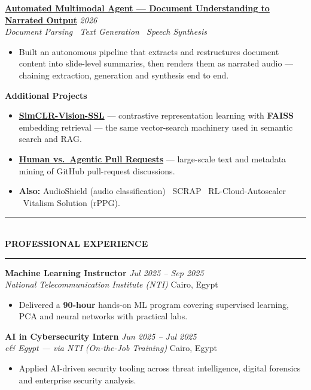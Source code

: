 \documentclass[10pt, a4paper]{article}
\newcommand{\cvsection}[1]{%
  \vspace{3pt}%
  {\color{navy}\rule{\linewidth}{1.1pt}}\\[0.5pt]%
  {\color{navy}\bfseries\fontsize{9.5}{11}\selectfont\uppercase{#1}}\\[-4pt]%
  {\color{teal}\rule{\linewidth}{0.6pt}}%
  \vspace{2pt}%
}
\newcommand{\cventry}[4]{%
  \vspace{2.5pt}%
  \textbf{\color{darkgray}#1} \hfill {\color{midgray}\textit{#3}}\\[-1.5pt]%
  {\color{teal}\textit{#2}} \hfill {\color{midgray}#4}%
}
\newcommand{\cvproject}[3]{%
  \vspace{2.5pt}%
  {\bfseries\color{navy}#1} \hfill {\color{midgray}\textit{#3}}\\[-1.5pt]%
  {\color{teal}\textit{#2}}%
}
\newcommand{\cvmini}[2]{\item {\bfseries\color{navy}#1} --- #2}
\newenvironment{cvitems}{%
  \begin{itemize}[leftmargin=11pt, itemsep=0.5pt, parsep=0pt, topsep=1pt,
                  label={\textcolor{teal}{$\bullet$}}]
}{%
  \end{itemize}%
}
\begin{document}
\cvproject{\href{https://github.com/MahmoudAlyosify/Automated-Multimodal-Agent-PDF-to-Narrated-PowerPoint}{Automated Multimodal Agent --- Document Understanding to Narrated Output}}
          {Document Parsing \textperiodcentered\ Text Generation \textperiodcentered\ Speech Synthesis}
          {2026}
\begin{cvitems}
  \item Built an autonomous pipeline that extracts and restructures document content into slide-level summaries, then renders them as narrated audio --- chaining extraction, generation and synthesis end to end.
\end{cvitems}

\vspace{3pt}
{\bfseries\color{navy}Additional Projects}
\begin{cvitems}
  \cvmini{\href{https://github.com/MahmoudAlyosify/SimCLR-Vision-SSL}{SimCLR-Vision-SSL}}{contrastive representation learning with \textbf{FAISS} embedding retrieval --- the same vector-search machinery used in semantic search and RAG.}
  \cvmini{\href{https://github.com/MahmoudAlyosify/Analyzing-Review-Effort-in-Human-vs.-Agentic-Pull-Requests}{Human vs.\ Agentic Pull Requests}}{large-scale text and metadata mining of GitHub pull-request discussions.}
  \item \textbf{Also:} AudioShield (audio classification) \textperiodcentered\ SCRAP \textperiodcentered\ RL-Cloud-Autoscaler \textperiodcentered\ Vitalism Solution (rPPG).
\end{cvitems}

\cvsection{Professional Experience}

\cventry{Machine Learning Instructor}{National Telecommunication Institute (NTI)}
        {Jul 2025 -- Sep 2025}{Cairo, Egypt}
\begin{cvitems}
  \item Delivered a \textbf{90-hour} hands-on ML program covering supervised learning, PCA and neural networks with practical labs.
\end{cvitems}

\cventry{AI in Cybersecurity Intern}{e\& Egypt --- via NTI (On-the-Job Training)}
        {Jun 2025 -- Jul 2025}{Cairo, Egypt}
\begin{cvitems}
  \item Applied AI-driven security tooling across threat intelligence, digital forensics and enterprise security analysis.
\end{cvitems}
\end{document}
